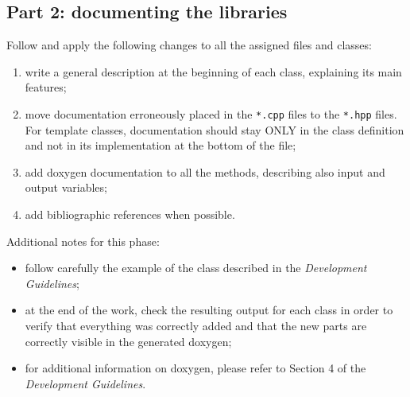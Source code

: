 \documentclass[10p]{article}
\theoremstyle{definition}
\begin{document}
\subsection*{Part 2: documenting the libraries}
Follow and apply the following changes to all the assigned files and classes:
\begin{enumerate}
  \item write a general description at the beginning of each class, explaining its main features;
  \item move documentation erroneously placed in the \texttt{*.cpp} files to the \texttt{*.hpp} files. For template classes, documentation should stay ONLY in the class definition and not in its implementation at the bottom of the file; 
  \item add doxygen documentation to all the methods, describing also input and output variables;%
  \item add bibliographic references when possible.
\end{enumerate}

\noindent Additional notes for this phase:
\begin{itemize}
  \item follow carefully the example of the  class described in the \emph{Development Guidelines};
  \item at the end of the work, check the resulting output for each class in order to verify that everything was correctly added and that the new parts are correctly visible in the generated doxygen;
  \item for additional information on doxygen, please refer to Section 4 of the \emph{Development Guidelines}.
\end{itemize}
\end{document}
